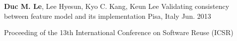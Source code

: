 \begin{cventries}
\cventry
{\textbf{Duc M. Le}, Lee Hyesun, Kyo C. Kang, Keun Lee } %
{Validating consistency between feature model and its implementation} %
{Pisa, Italy} %
{Jun. 2013} %
{
	\begin{cvitems} %
		\item Proceeding of the 13th International Conference on Software Reuse (ICSR)
	\end{cvitems}
}

\end{cventries}